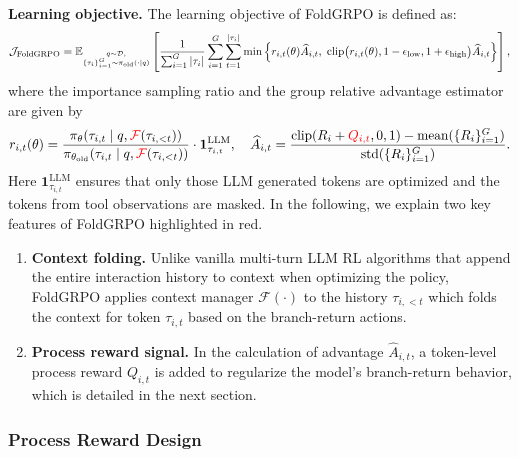 \textbf{Learning objective.}
The learning objective of FoldGRPO is defined as:
\begin{equation}\small
\mathcal{J}_{\text{FoldGRPO}} = \mathbb{E}_{\substack{q\sim \mathcal{D},\\ \{\tau_i\}_{i=1}^{G}\sim \pi_{\text{old}}(\cdot|q)} }
\left[
\frac{1}{\sum_{i=1}^{G} |{\tau}_i|}
\sum_{i=1}^{G} \sum_{t=1}^{|{\tau}_i|}
\min\Big\{
r_{i,t}(\theta) \widehat{A}_{i,t},
\ \mathrm{clip}\big(r_{i,t}(\theta), 1-\epsilon_{\text{low}}, 1+\epsilon_{\text{high}}\big)\widehat{A}_{i,t}
\Big\}
\right],
\end{equation}
where the importance sampling ratio and the group relative advantage estimator \citep{shao2024deepseekmath} are given by
\begin{equation}
r_{i,t}(\theta) =
\frac{\pi_{\theta}({\tau}_{i,t}\mid q, \mathcal{\textcolor{red}{F}}({\tau}_{i, <t}))}
     {\pi_{\theta_{\text{old}}}({\tau}_{i,t}\mid q, \mathcal{\textcolor{red}{F}}({\tau}_{i, <t}))}\cdot
     \mathbf{1}_{\tau_{i,t}}^{\mathrm{LLM}},
\quad
\widehat{A}_{i,t} =
\frac{\mathrm{clip}(R_i + \textcolor{red}{Q_{i, t}}, 0, 1) - \mathrm{mean}(\{R_i\}_{i=1}^{G})}
     {\mathrm{std}(\{R_i\}_{i=1}^{G})}.
\end{equation}
Here $\mathbf{1}_{\tau_{i,t}}^{\mathrm{LLM}}$ ensures that only those LLM generated tokens are optimized and the tokens from tool observations are masked.
In the following, we explain two key features of FoldGRPO highlighted in red.

\begin{enumerate}[label=(\roman*),leftmargin=20pt]
\item \textbf{Context folding.}
Unlike vanilla multi-turn LLM RL algorithms that append the entire interaction history to context when optimizing the policy, FoldGRPO
applies context manager $\mathcal{F}(\cdot)$ to the history ${\tau}_{i,<t}$ which folds the context for token ${\tau}_{i,t}$ based on the branch-return actions.

\item \textbf{Process reward signal.}
In the calculation of advantage $\widehat{A}_{i,t}$, a token-level process reward $Q_{i,t}$ is added to regularize the model’s branch-return behavior, which is detailed in the next section.
\end{enumerate}

\subsubsection{Process Reward Design}\label{subsubsec: prm}

